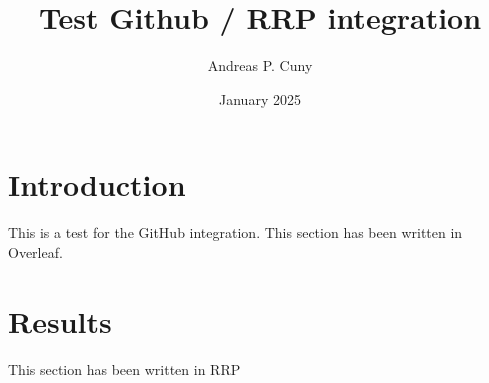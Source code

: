 \documentclass{article}
\title{Test Github / RRP integration}
\author{Andreas P. Cuny}
\date{January 2025}
\begin{document}
\maketitle

\section{Introduction}

This is a test for the GitHub integration.
This section has been written in Overleaf.

\section{Results}

This section has been written in RRP
\end{document}
